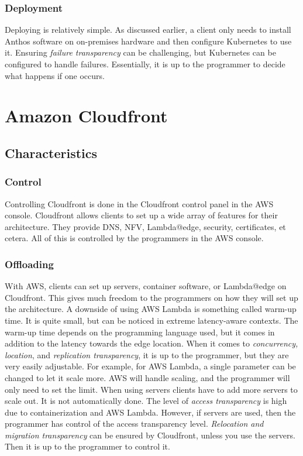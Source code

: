 \subsubsection{Deployment}
Deploying is relatively simple. As discussed earlier, a client only needs to install Anthos software on on-premises hardware and then configure Kubernetes to use it. Ensuring \textit{failure transparency} can be challenging, but Kubernetes can be configured to handle failures. Essentially, it is up to the programmer to decide what happens if one occurs.












\section{Amazon Cloudfront}
\subsection{Characteristics}
\subsubsection{Control}
Controlling Cloudfront is done in the Cloudfront control panel in the AWS console. Cloudfront allows clients to set up a wide array of features for their architecture. They provide DNS, NFV, Lambda@edge, security, certificates, et cetera. All of this is controlled by the programmers in the AWS console.  


\subsubsection{Offloading}
With AWS, clients can set up servers, container software, or Lambda@edge on Cloudfront. This gives much freedom to the programmers on how they will set up the architecture. A downside of using AWS Lambda is something called warm-up time. It is quite small, but can be noticed in extreme latency-aware contexts. The warm-up time depends on the programming language used, but it comes in addition to the latency towards the edge location. When it comes to \textit{concurrency, location}, and \textit{replication transparency}, it is up to the programmer, but they are very easily adjustable. For example, for AWS Lambda, a single parameter can be changed to let it scale more. AWS will handle scaling, and the programmer will only need to set the limit. When using servers clients have to add more servers to scale out. It is not automatically done. The level of \textit{access transparency} is high due to containerization and AWS Lambda. However, if servers are used, then the programmer has control of the access transparency level. \textit{Relocation and migration transparency} can be ensured by Cloudfront, unless you use the servers. Then it is up to the programmer to control it. 


